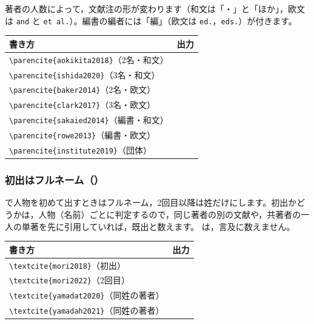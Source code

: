 著者の人数によって，文献注の形が変わります（和文は「・」と「ほか」，欧文は \texttt{and} と \texttt{et al.}）。編書の編者には「編」（欧文は \texttt{ed.}，\texttt{eds.}）が付きます。

\begin{center}\small
\begin{tabular}{@{}L{0.46\textwidth}L{0.42\textwidth}@{}}
\toprule
\textbf{書き方} & \textbf{出力} \\
\midrule
\verb|\parencite{aokikita2018}|（2名・和文）& \parencite{aokikita2018} \\
\verb|\parencite{ishida2020}|（3名・和文）& \parencite{ishida2020} \\
\verb|\parencite{baker2014}|（2名・欧文）& \parencite{baker2014} \\
\verb|\parencite{clark2017}|（3名・欧文）& \parencite{clark2017} \\
\verb|\parencite{sakaied2014}|（編書・和文）& \parencite{sakaied2014} \\
\verb|\parencite{rowe2013}|（編書・欧文）& \parencite{rowe2013} \\
\verb|\parencite{institute2019}|（団体）& \parencite{institute2019} \\
\bottomrule
\end{tabular}
\end{center}

\subsubsection{初出はフルネーム（）}\label{sec:firstfull}
 で人物を初めて出すときはフルネーム，2回目以降は姓だけにします。初出かどうかは，人物（名前）ごとに判定するので，同じ著者の別の文献や，共著者の一人の単著を先に引用していれば，既出と数えます。 は，言及に数えません。

\begin{center}\small
\begin{tabular}{@{}L{0.46\textwidth}L{0.42\textwidth}@{}}
\toprule
\textbf{書き方} & \textbf{出力} \\
\midrule
\verb|\textcite{mori2018}|（初出）& \textcite{mori2018} \\
\verb|\textcite{mori2022}|（2回目）& \textcite{mori2022} \\
\verb|\textcite{yamadat2020}|（同姓の著者）& \textcite{yamadat2020} \\
\verb|\textcite{yamadah2021}|（同姓の著者）& \textcite{yamadah2021} \\
\bottomrule
\end{tabular}
\end{center}

